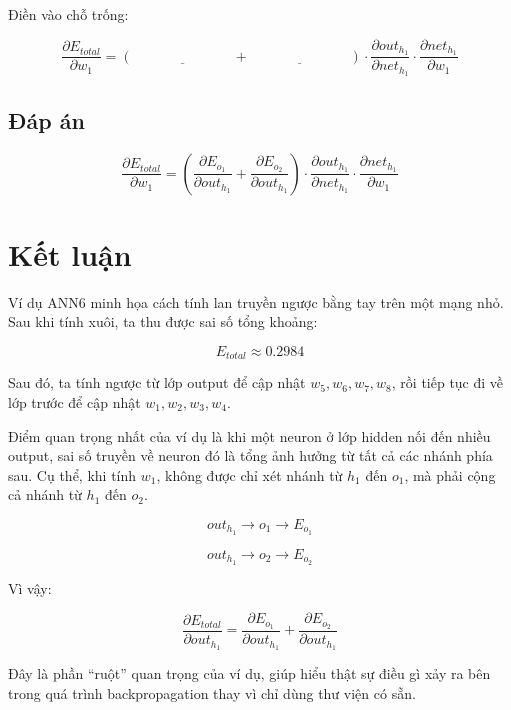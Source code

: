 \documentclass[12pt,a4paper]{report}
\begin{document}
Điền vào chỗ trống:

\[
    \frac{\partial E_{total}}{\partial w_1}
    =
    \left(
    \underline{\hspace{3cm}}
    +
    \underline{\hspace{3cm}}
    \right)
    \cdot
    \frac{\partial out_{h_1}}{\partial net_{h_1}}
    \cdot
    \frac{\partial net_{h_1}}{\partial w_1}
\]

\section*{Đáp án}

\[
    \frac{\partial E_{total}}{\partial w_1}
    =
    \left(
    \frac{\partial E_{o_1}}{\partial out_{h_1}}
    +
    \frac{\partial E_{o_2}}{\partial out_{h_1}}
    \right)
    \cdot
    \frac{\partial out_{h_1}}{\partial net_{h_1}}
    \cdot
    \frac{\partial net_{h_1}}{\partial w_1}
\]

\chapter*{Kết luận}

Ví dụ ANN6 minh họa cách tính lan truyền ngược bằng tay trên một mạng nhỏ. Sau khi tính xuôi, ta thu được sai số tổng khoảng:

\[
    E_{total}\approx 0.2984
\]

Sau đó, ta tính ngược từ lớp output để cập nhật $w_5,w_6,w_7,w_8$, rồi tiếp tục đi về lớp trước để cập nhật $w_1,w_2,w_3,w_4$.

Điểm quan trọng nhất của ví dụ là khi một neuron ở lớp hidden nối đến nhiều output, sai số truyền về neuron đó là tổng ảnh hưởng từ tất cả các nhánh phía sau. Cụ thể, khi tính $w_1$, không được chỉ xét nhánh từ $h_1$ đến $o_1$, mà phải cộng cả nhánh từ $h_1$ đến $o_2$.

\[
    out_{h_1}
    \rightarrow
    o_1
    \rightarrow
    E_{o_1}
\]

\[
    out_{h_1}
    \rightarrow
    o_2
    \rightarrow
    E_{o_2}
\]

Vì vậy:

\[
    \frac{\partial E_{total}}{\partial out_{h_1}}
    =
    \frac{\partial E_{o_1}}{\partial out_{h_1}}
    +
    \frac{\partial E_{o_2}}{\partial out_{h_1}}
\]

Đây là phần ``ruột'' quan trọng của ví dụ, giúp hiểu thật sự điều gì xảy ra bên trong quá trình backpropagation thay vì chỉ dùng thư viện có sẵn.
\end{document}
